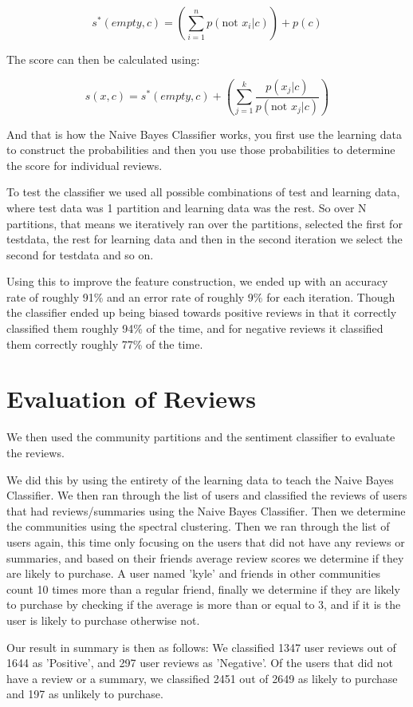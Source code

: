 	$$s^{*}(empty, c) = (\sum\limits_{i=1}^{n} p(\text{not } x_i | c)) + p(c)$$
	
	The score can then be calculated using:
	
	$$s(x, c) = s^{*}(empty, c) + (\sum\limits_{j=1}^{k} \frac{p(x_{j}|c)}{p(\text{not } x_{j}|c)})$$
	
	And that is how the Naive Bayes Classifier works, you first use the learning data to construct the probabilities and then you use those probabilities to determine the score for individual reviews.
	
	To test the classifier we used all possible combinations of test and learning data, where test data was 1 partition and learning data was the rest. So over N partitions, that means we iteratively ran over the partitions, selected the first for testdata, the rest for learning data and then in the second iteration we select the second for testdata and so on.
	
	Using this to improve the feature construction, we ended up with an accuracy rate of roughly 91\% and an error rate of roughly 9\% for each iteration. Though the classifier ended up being biased towards positive reviews in that it correctly classified them roughly 94\% of the time, and for negative reviews it classified them correctly roughly 77\% of the time.
	
	\section{Evaluation of Reviews}
	We then used the community partitions and the sentiment classifier to evaluate the reviews. 

	We did this by using the entirety of the learning data to teach the Naive Bayes Classifier.
	We then ran through the list of users and classified the reviews of users that had reviews/summaries using the Naive Bayes Classifier.
	Then we determine the communities using the spectral clustering.
	Then we ran through the list of users again, this time only focusing on the users that did not have any reviews or summaries, and based on their friends average review scores we determine if they are likely to purchase. A user named 'kyle' and friends in other communities count 10 times more than a regular friend, finally we determine if they are likely to purchase by checking if the average is more than or equal to 3, and if it is the user is likely to purchase otherwise not.
	
	Our result in summary is then as follows:
	We classified 1347 user reviews out of 1644 as 'Positive', and 297 user reviews as 'Negative'.
	Of the users that did not have a review or a summary, we classified 2451 out of 2649 as likely to purchase and 197 as unlikely to purchase.
	
	


